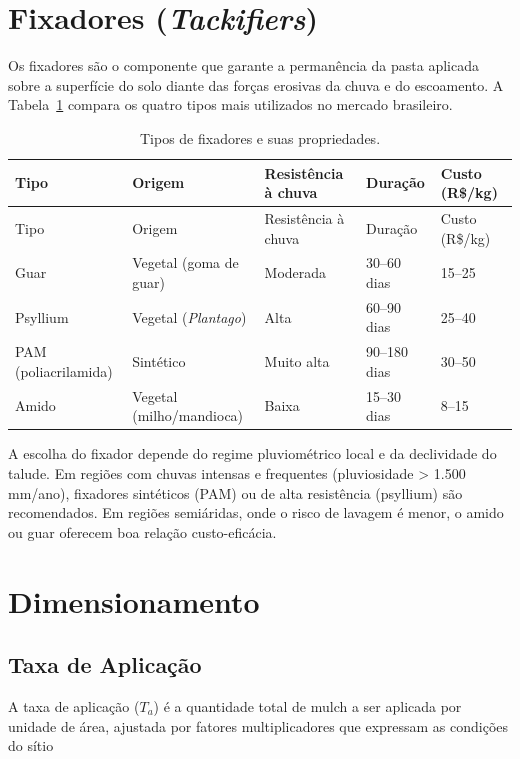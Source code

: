 \documentclass[
  portuguese,
  11pt,
  a4paper,
  open=any]{scrbook}
\begin{document}
\section{\texorpdfstring{Fixadores
(\emph{Tackifiers})}{Fixadores (Tackifiers)}}\label{fixadores-tackifiers}

Os fixadores são o componente que garante a permanência da pasta
aplicada sobre a superfície do solo diante das forças erosivas da chuva
e do escoamento. A Tabela~\ref{tbl-fixadores} compara os quatro tipos
mais utilizados no mercado brasileiro.

\begin{longtable}[]{@{}lllll@{}}
\caption{Tipos de fixadores e suas
propriedades.}\label{tbl-fixadores}\tabularnewline
\toprule\noalign{}
Tipo & Origem & Resistência à chuva & Duração & Custo (R\$/kg) \\
\midrule\noalign{}
\endfirsthead
\toprule\noalign{}
Tipo & Origem & Resistência à chuva & Duração & Custo (R\$/kg) \\
\midrule\noalign{}
\endhead
\bottomrule\noalign{}
\endlastfoot
Guar & Vegetal (goma de guar) & Moderada & 30--60 dias & 15--25 \\
Psyllium & Vegetal (\emph{Plantago}) & Alta & 60--90 dias & 25--40 \\
PAM (poliacrilamida) & Sintético & Muito alta & 90--180 dias & 30--50 \\
Amido & Vegetal (milho/mandioca) & Baixa & 15--30 dias & 8--15 \\
\end{longtable}

A escolha do fixador depende do regime pluviométrico local e da
declividade do talude. Em regiões com chuvas intensas e frequentes
(pluviosidade \textgreater{} 1.500 mm/ano), fixadores sintéticos (PAM)
ou de alta resistência (psyllium) são recomendados. Em regiões
semiáridas, onde o risco de lavagem é menor, o amido ou guar oferecem
boa relação custo-eficácia.

\section{Dimensionamento}\label{dimensionamento-3}

\subsection{Taxa de Aplicação}\label{taxa-de-aplicauxe7uxe3o}

A taxa de aplicação (\(T_a\)) é a quantidade total de mulch a ser
aplicada por unidade de área, ajustada por fatores multiplicadores que
expressam as condições do sítio
\end{document}
